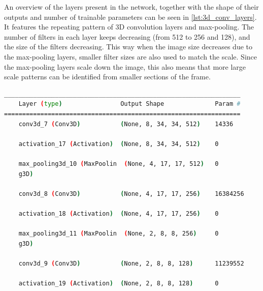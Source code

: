 An overview of the layers present in the network, together with the shape of their outputs and number of trainable parameters can be seen in \cref{lst:3d_conv_layers}. It features the repeating pattern of 3D convolution layers and max-pooling. The number of filters in each layer keeps decreasing (from 512 to 256 and 128), and the size of the filters decreasing. This way when the image size decreases due to the max-pooling layers, smaller filter sizes are also used to match the scale. Since the max-pooling layers scale down the image, this also means that more large scale patterns can be identified from smaller sections of the frame.

\begin{lstlisting}[language=Bash,caption={Overview of layers in 3D convolutional network},label={lst:3d_conv_layers},numbers=none,float=htb]
_________________________________________________________________
    Layer (type)                Output Shape              Param #   
=================================================================
    conv3d_7 (Conv3D)           (None, 8, 34, 34, 512)    14336     
                                                                    
    activation_17 (Activation)  (None, 8, 34, 34, 512)    0         
                                                                    
    max_pooling3d_10 (MaxPoolin  (None, 4, 17, 17, 512)   0         
    g3D)                                                            
                                                                    
    conv3d_8 (Conv3D)           (None, 4, 17, 17, 256)    16384256  
                                                                    
    activation_18 (Activation)  (None, 4, 17, 17, 256)    0         
                                                                    
    max_pooling3d_11 (MaxPoolin  (None, 2, 8, 8, 256)     0         
    g3D)                                                            
                                                                    
    conv3d_9 (Conv3D)           (None, 2, 8, 8, 128)      11239552  
                                                                    
    activation_19 (Activation)  (None, 2, 8, 8, 128)      0         
                                                                    

\end{lstlisting}

